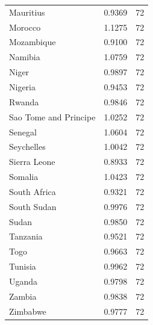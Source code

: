 \begin{longtable}{lrr}
Mauritius & 0.9369 & 72 \\
Morocco & 1.1275 & 72 \\
Mozambique & 0.9100 & 72 \\
Namibia & 1.0759 & 72 \\
Niger & 0.9897 & 72 \\
Nigeria & 0.9453 & 72 \\
Rwanda & 0.9846 & 72 \\
Sao Tome and Principe & 1.0252 & 72 \\
Senegal & 1.0604 & 72 \\
Seychelles & 1.0042 & 72 \\
Sierra Leone & 0.8933 & 72 \\
Somalia & 1.0423 & 72 \\
South Africa & 0.9321 & 72 \\
South Sudan & 0.9976 & 72 \\
Sudan & 0.9850 & 72 \\
Tanzania & 0.9521 & 72 \\
Togo & 0.9663 & 72 \\
Tunisia & 0.9962 & 72 \\
Uganda & 0.9798 & 72 \\
Zambia & 0.9838 & 72 \\
Zimbabwe & 0.9777 & 72 \\
\bottomrule
\end{longtable}

